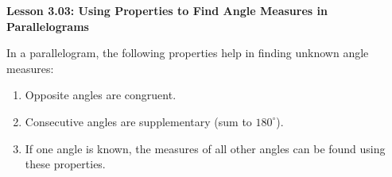 \begin{center}
\textbf{Lesson 3.03: Using Properties to Find Angle Measures in Parallelograms}
\end{center}

\vspace*{-1.5ex}


\noindent In a parallelogram, the following properties help in finding unknown angle measures:
\begin{enumerate}[label=\color{blue}\arabic*.]
    \item Opposite angles are congruent.
    \item Consecutive angles are supplementary (sum to \(180^\circ\)).
    \item If one angle is known, the measures of all other angles can be found using these properties.
\end{enumerate}
